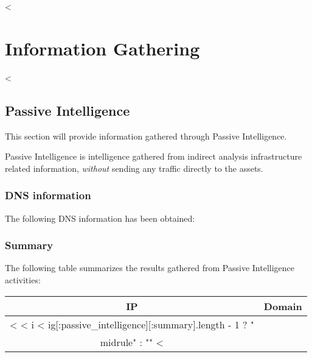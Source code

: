 

<%


\chapter{Information Gathering}\label{ch:infogath}

  <%

  \section {Passive Intelligence}\label{sec:passiveint}

    This section will provide information gathered through Passive Intelligence.

    Passive Intelligence is intelligence gathered from indirect analysis
    infrastructure related information, \textit{without} sending any traffic
    directly to the assets.

    \subsection{DNS information}\label{subsec:passiveint-dnsinfo}

      The following DNS information has been obtained:

      \begin{itemize}
        <%
          \item \textbf{<%
            \begin{verbatim}
<%= dns_scan[:result] %>
            \end{verbatim}
        <%
      \end{itemize}

    \subsection{Summary}\label{subsec:passiveint-summary}

      The following table summarizes the results gathered from Passive
      Intelligence activities:

      \begin{center}
        \begin{tabularx}{0.4\textwidth}{c c}
          \toprule
          \textbf{IP} & \textbf{Domain} \\ \midrule
          <%
            <%
              i < ig[:passive_intelligence][:summary].length - 1 ?
              "\\midrule" :
              ""
          <%
          \bottomrule
        \end{tabularx}
      \end{center}

